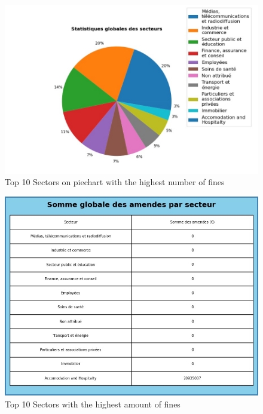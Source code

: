 \documentclass[12pt]{article}
\begin{document}
\newpage

	\begin{multicols}{2}
	\begin{figure}
		[H]\centering\includegraphics[width=1.0\linewidth]{graphs/sector_data}
		\caption{Top 10 Sectors on piechart with the highest number of fines}
	\end{figure}
	\begin{figure}
		[H]\centering\includegraphics[width=1\linewidth]{graphs/sector_data_fines}
		\caption{Top 10 Sectors with the highest amount of fines}
	 \end{figure}
	
	\end{multicols}
	
	
	
\end{document}
